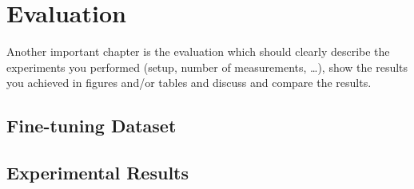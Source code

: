 \chapter{Evaluation}
\label{cha:evaluation}

Another important chapter is the evaluation which should clearly describe the
experiments you performed (setup, number of measurements, \dots), show the
results you achieved in figures and/or tables and discuss and compare the
results.

\section{Fine-tuning Dataset}
\label{eval:ft}

\section{Experimental Results}
\label{eval:res}